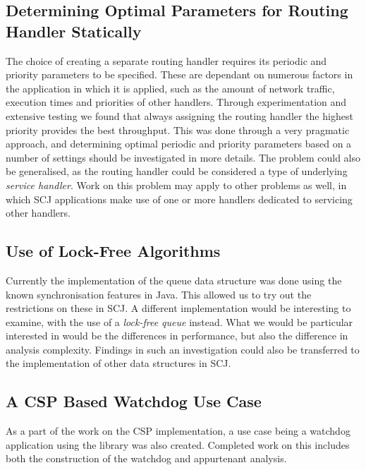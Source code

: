 \subsection{Determining Optimal Parameters for Routing Handler Statically} %
\label{sub:determining_optimal_parameters_for_routing_handler_statically}
The choice of creating a separate routing handler requires its periodic and priority parameters to be specified. These are dependant on numerous factors in the application in which it is applied, such as the amount of network traffic, execution times and priorities of other handlers. Through experimentation and extensive testing we found that always assigning the routing handler the highest priority provides the best throughput. This was done through a very pragmatic approach, and determining optimal periodic and priority parameters based on a number of settings should be investigated in more details. The problem could also be generalised, as the routing handler could be considered a type of underlying \textit{service handler}. Work on this problem may apply to other problems as well, in which SCJ applications make use of one or more handlers dedicated to servicing other handlers.

\subsection{Use of Lock-Free Algorithms} %
\label{sub:lock_free_algorithms}
Currently the implementation of the queue data structure was done using the known synchronisation features in Java. This allowed us to try out the restrictions on these in SCJ. A different implementation would be interesting to examine, with the use of a \textit{lock-free queue} instead\cite{Valois94implementinglock-free}\cite{Michael:1996:SFP:248052.248106}. What we would be particular interested in would be the differences in performance, but also the difference in analysis complexity. Findings in such an investigation could also be transferred to the implementation of other data structures in SCJ.

\subsection{A CSP Based Watchdog Use Case} %
\label{sub:csp_based_watchdog}
As a part of the work on the CSP implementation, a use case being a watchdog application using the library was also created. Completed work on this includes both the construction of the watchdog and appurtenant analysis.

